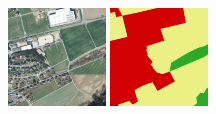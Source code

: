 \begin{figure}
    \newcommand{\DiscussionImageWidth}{0.23\textwidth}
    \centering

    \includegraphics[width=\DiscussionImageWidth]{images/segmentation_discussion/images/1.png} \hfill
    \includegraphics[width=\DiscussionImageWidth]{images/segmentation_discussion/labels/1.png} \hfill

\end{figure}
